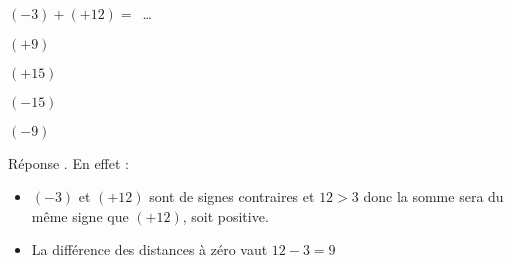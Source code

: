 \begin{exercice}
    $(-3)+(+12)=$~\ldots
    \begin{ChoixQCM}{4}
        \item $(+9)$
        \item $(+15)$
        \item $(-15)$
        \item $(-9)$
    \end{ChoixQCM}
\end{exercice}
\begin{corrige}
    Réponse . En effet :
    \begin{itemize}
        \item $(-3)$ et $(+12)$ sont de signes contraires et $12>3$ donc la somme sera du même signe que $(+12)$, soit positive.
        \item La différence des distances à zéro vaut $12-3=9$
    \end{itemize}
\end{corrige}